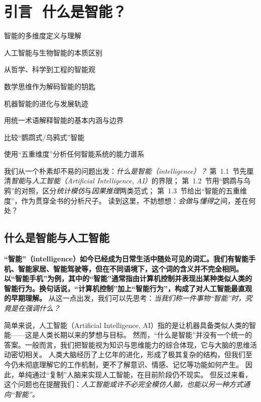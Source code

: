 \chapter{ 引言\,\,  什么是智能？}
 \begin{introduction}
  \item 智能的多维度定义与理解
  \item 人工智能与生物智能的本质区别
  \item 从哲学、科学到工程的智能观
  \item 数学思维作为解码智能的钥匙
  \item 机器智能的进化与发展轨迹
\end{introduction}

\begin{introduction}
  \item 用统一术语解释智能的基本内涵与边界
  \item 比较“鹦鹉式/乌鸦式”智能
  \item 使用“五重维度”分析任何智能系统的能力谱系
\end{introduction}

我们从一个朴素却不易的问题出发：\emph{什么是智能（intelligence）？}
第~1.1~节先厘清\emph{智能}与\emph{人工智能（Artificial Intelligence, AI）}的界限；
第~1.2~节用“鹦鹉与乌鸦”的对照，区分\emph{统计模仿}与\emph{因果推理}两类范式；
第~1.3~节给出“智能的五重维度”，作为贯穿全书的分析尺子。
读到这里，不妨想想：\emph{会做}与\emph{懂得}之间，差在何处？

\section{什么是智能与人工智能}

\textbf{“智能”（intelligence）如今已经成为日常生活中随处可见的词汇。我们有智能手机、智能家居、智能驾驶等，但在不同语境下，这个词的含义并不完全相同。以“智能手机”为例，其中的“智能”通常指由计算机控制并表现出某种类似人类的智能行为。换句话说，“计算机控制”加上“智能行为”，构成了对人工智能最直观的早期理解。}
从这一点出发，我们可以先思考：\emph{当我们称一件事物“智能”时，究竟是在强调什么？}

简单来说，人工智能（Artificial Intelligence, AI）指的是让机器具备类似人类的智能——这是人类长期以来的梦想与目标。
然而，“什么是智能”并没有一个统一的答案。一般而言，我们把智能视为知识与思维能力的综合体现，它与大脑的思维活动密切相关。
人类大脑经历了上亿年的进化，形成了极其复杂的结构，但我们至今仍未彻底理解它的工作机制，更不了解意识、情感、记忆等功能如何产生。
因此，单纯通过“复制”人脑来实现人工智能，在目前阶段仍不现实。
但反过来看，这个问题也在提醒我们：\emph{人工智能或许不必完全模仿人脑，也能以另一种方式通向“智能”。}


